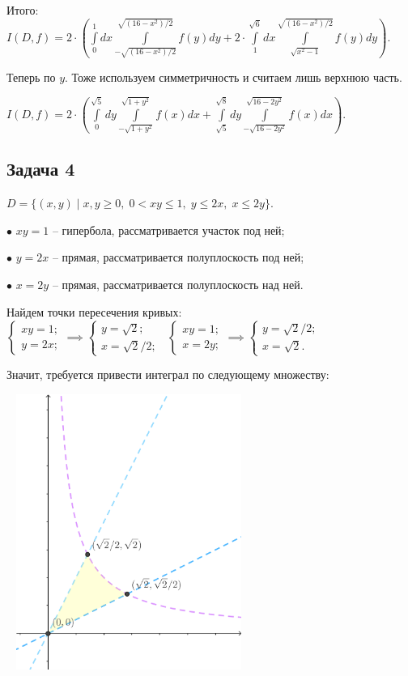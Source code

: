\documentclass[a4paper, fleqn]{article}
\begin{document}
    
    
    Итого: $I(D, f) = 2 \cdot \left( \displaystyle \int\limits_0^{1} dx \int\limits_{-\sqrt{(16 - x^2)/2}}^{\sqrt{(16 - x^2)/2} } f(y) dy + 2 \cdot \displaystyle \int\limits_1^{\sqrt{6}} dx \int\limits_{\sqrt{x^2 - 1}}^{\sqrt{(16 - x^2)/2} } f(y) dy \right).$
    
    Теперь по $y$. Тоже используем симметричность и считаем лишь верхнюю часть.
    
     $I(D,f ) = 2 \cdot \left( \displaystyle \int\limits_0^{\sqrt{5}} dy \int\limits_{-\sqrt{1 + y^2}}^{\sqrt{1 + y^2} } f(x) dx + \displaystyle \int\limits_{\sqrt{5}}^{\sqrt{8}} dy \int\limits_{-\sqrt{16 - 2y^2}}^{\sqrt{16 - 2y^2} } f(x) dx \right).$
    
     \subsection*{Задача 4}
        
    $D = \{ (x,y ) \mid x, y \geq 0, \; 0< xy \leq 1, \; y \leq 2x, \; x \leq 2y\}.$
    
    $\bullet$ $xy = 1$ -- гипербола, рассматривается участок под ней;
    
    $\bullet$ $y = 2x$ -- прямая, рассматривается полуплоскость под ней;
    
    $\bullet$ $x = 2y$ -- прямая, рассматривается полуплоскость над ней.
    
    Найдем точки пересечения кривых: $\begin{cases} xy = 1;\\
    y = 2x; \end{cases} \implies\begin{cases} y = \sqrt{2}; \\  x = \sqrt{2}/2 ;\end{cases}\; \; \begin{cases}xy = 1;\\
    x = 2y;\end{cases}\implies\begin{cases}y = \sqrt{2}/2; \\  x = \sqrt{2} .\end{cases}$
    
    Значит, требуется привести интеграл по следующему множеству:
    
    \includegraphics[width=8cm, height=9cm]{task 4.png}
    
\end{document}
